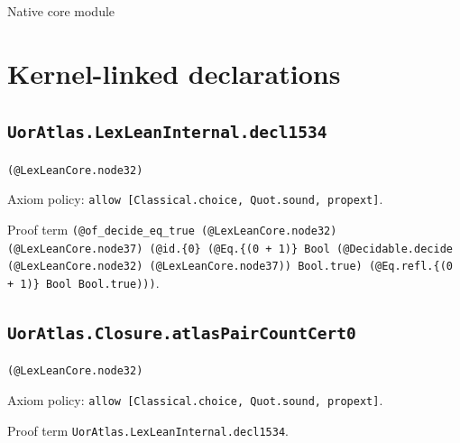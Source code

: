 \documentclass[11pt]{article}
\begin{document}
\begin{center}{\LARGE Native core module}\end{center}
\section*{Kernel-linked declarations}
\subsection*{\texttt{UorAtlas.LexLeanInternal.decl1534}}
\noindent\texttt{(@LexLeanCore.node32)}\par
\noindent Axiom policy: \texttt{allow [Classical.choice, Quot.sound, propext]}.\par
\noindent Proof term \texttt{(@of\_decide\_eq\_true (@LexLeanCore.node32) (@LexLeanCore.node37) (@id.\{0\} (@Eq.\{(0 + 1)\} Bool (@Decidable.decide (@LexLeanCore.node32) (@LexLeanCore.node37)) Bool.true) (@Eq.refl.\{(0 + 1)\} Bool Bool.true)))}.\par
\subsection*{\texttt{UorAtlas.Closure.atlasPairCountCert0}}
\noindent\texttt{(@LexLeanCore.node32)}\par
\noindent Axiom policy: \texttt{allow [Classical.choice, Quot.sound, propext]}.\par
\noindent Proof term \texttt{UorAtlas.LexLeanInternal.decl1534}.\par
\end{document}
